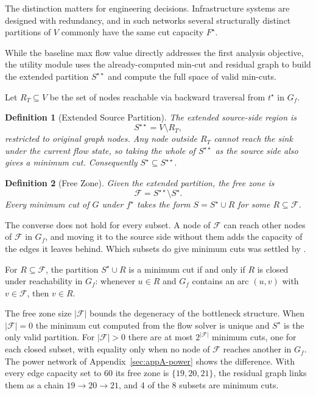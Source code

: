 \documentclass[12pt]{report}
\newtheorem{definition}{Definition}
\begin{document}
The distinction matters for engineering decisions. Infrastructure systems are designed with redundancy, and in such networks several structurally distinct partitions of $V$ commonly have the same cut capacity $F^\star$.

While the baseline max flow value directly addresses the first analysis objective, the utility module uses the already-computed min-cut and residual graph to build the extended partition $S^{\star\star}$ and compute the full space of valid min-cuts. 

Let $R_T \subseteq V$ be the set of nodes reachable via backward traversal from 
$t^\star$ in $G_f$.

\begin{definition}[Extended Source Partition]
The extended source-side region is
\[
S^{\star\star} = V \setminus R_T,
\]
restricted to original graph nodes. Any node outside $R_T$ cannot reach the sink
under the current flow state, so taking the whole of $S^{\star\star}$ as the source
side also gives a minimum cut. Consequently $S^\star \subseteq S^{\star\star}$.
\end{definition}

\begin{definition}[Free Zone]
Given the extended partition, the free zone is
\[
\mathcal{F} = S^{\star\star} \setminus S^\star.
\]
Every minimum cut of $G$ under $f^\star$ takes the form
$S = S^\star \cup R$ for some $R \subseteq \mathcal{F}$.
\end{definition}

The converse does not hold for every subset. A node of $\mathcal{F}$ can reach other nodes of $\mathcal{F}$ in $G_f$, and moving it to the source side without them adds the capacity of the edges it leaves behind. Which subsets do give minimum cuts was settled by \cite{picard1980structure}.

\begin{theorem}\label{thm:closed-cuts}
For $R \subseteq \mathcal{F}$, the partition $S^\star \cup R$ is a minimum cut if and only if $R$ is closed under reachability in $G_f$: whenever $u \in R$ and $G_f$ contains an arc $(u,v)$ with $v \in \mathcal{F}$, then $v \in R$.
\end{theorem}

The free zone size $|\mathcal{F}|$ bounds the degeneracy of the bottleneck structure. When $|\mathcal{F}| = 0$ the minimum cut computed from the flow solver is unique and $S^\star$ is the only valid partition. For $|\mathcal{F}| > 0$ there are at most $2^{|\mathcal{F}|}$ minimum cuts, one for each closed subset, with equality only when no node of $\mathcal{F}$ reaches another in $G_f$. The power network of Appendix~\ref{sec:appA-power} shows the difference. With every edge capacity set to 60 its free zone is $\{19, 20, 21\}$, the residual graph links them as a chain $19 \to 20 \to 21$, and 4 of the 8 subsets are minimum cuts.
\end{document}

